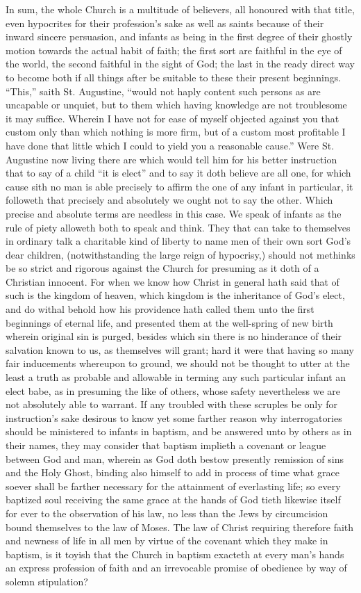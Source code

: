 In sum, the whole Church is a multitude of believers, all honoured with that title, even hypocrites for their profession’s sake as well as saints because of their inward sincere persuasion, and infants as being in the first degree of their ghostly motion towards the actual habit of faith; the first sort are faithful in the eye of the world, the second faithful in the sight of God; the last in the ready direct way to become both if all things after be suitable to these their present beginnings. “This,” saith St. Augustine, “would not haply content such persons as are uncapable or unquiet, but to them which having knowledge are not troublesome it may suffice. Wherein I have not for ease of myself objected against you that custom only than which nothing is more firm, but of a custom most profitable I have done that little which I could to yield you a reasonable cause.”
Were St. Augustine now living there are which would tell him for his better instruction that to say of a child “it is elect” and to say it doth believe are all one, for which cause sith no man is able precisely to affirm the one of any infant in particular, it followeth that precisely and absolutely we ought not to say the other.
Which precise and absolute terms are needless in this case. We speak of infants as the rule of piety alloweth both to speak and think. They that can take to themselves in ordinary talk a charitable kind of liberty to name men of their own sort God’s dear children, (notwithstanding the large reign of hypocrisy,) should not methinks be so strict and rigorous against the Church for presuming as it doth of a Christian innocent. For when we know how Christ in general hath said that of such is the kingdom of heaven, which  kingdom is the inheritance of God’s elect, and do withal behold how his providence hath called them unto the first beginnings of eternal life, and presented them at the well-spring of new birth wherein original sin is purged, besides which sin there is no hinderance of their salvation known to us, as themselves will grant; hard it were that having so many fair inducements whereupon to ground, we should not be thought to utter at the least a truth as probable and allowable in terming any such particular infant an elect babe, as in presuming the like of others, whose safety nevertheless we are not absolutely able to warrant.
If any troubled with these scruples be only for instruction’s sake desirous to know yet some farther reason why interrogatories should be ministered to infants in baptism, and be answered unto by others as in their names, they may consider that baptism implieth a covenant or league between God and man, wherein as God doth bestow presently remission of sins and the Holy Ghost, binding also himself to add in process of time what grace soever shall be farther necessary for the attainment of everlasting life; so every baptized soul receiving the same grace at the hands of God tieth likewise itself for ever to the observation of his law, no less than the Jews by circumcision bound themselves to the law of Moses. The law of Christ requiring therefore faith and newness of life in all men by virtue of the covenant which they make in baptism, is it toyish that the Church in baptism exacteth at every man’s hands an express profession of faith and an irrevocable promise of obedience by way of solemn stipulation?
